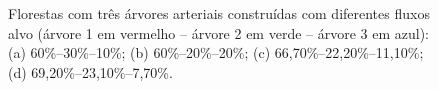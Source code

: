 \begin{figure}[!htb]
  \centering \captiondelim{: }
  \caption{Florestas com três árvores arteriais construídas com diferentes fluxos alvo (árvore 1 em vermelho -- árvore 2 em verde -- árvore 3 em azul): 
  (a) 60\%--30\%--10\%; (b) 60\%--20\%--20\%;  (c) 66,70\%--22,20\%--11,10\%;  (d) 69,20\%--23,10\%--7,70\%.}
  
  \hspace{12pt}


\end{figure}
